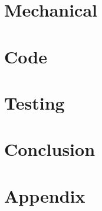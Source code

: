 \documentclass[11pt]{article}
\begin{document}
\section{Mechanical}

\section{Code}
    
    
\section{Testing}
    
\section{Conclusion}

\newpage
\section{Appendix}

\begin{multicols}{2}

\end{multicols}


\newpage
\end{document}
